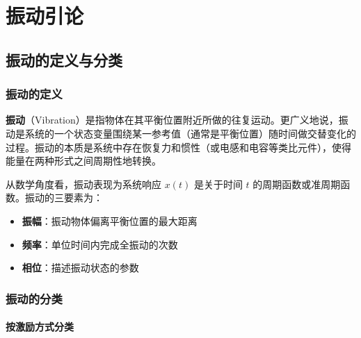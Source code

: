 \chapter{振动引论}

\section{振动的定义与分类}

\subsection{振动的定义}

\textbf{振动}（Vibration）是指物体在其平衡位置附近所做的往复运动。更广义地说，振动是系统的一个状态变量围绕某一参考值（通常是平衡位置）随时间做交替变化的过程。振动的本质是系统中存在恢复力和惯性（或电感和电容等类比元件），使得能量在两种形式之间周期性地转换。

从数学角度看，振动表现为系统响应 $x(t)$ 是关于时间 $t$ 的周期函数或准周期函数。振动的三要素为：
\begin{itemize}
    \item \textbf{振幅}：振动物体偏离平衡位置的最大距离
    \item \textbf{频率}：单位时间内完成全振动的次数
    \item \textbf{相位}：描述振动状态的参数
\end{itemize}

\subsection{振动的分类}

\subsubsection{按激励方式分类}

